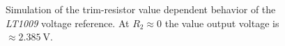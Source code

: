     \newpage
    \begin{figure}[ht]
        \centering
        
        \caption[Simulation of the trim-resistor value dependent behavior of the \textit{LT1009} voltage reference]{Simulation of the trim-resistor value dependent behavior of the \textit{LT1009} voltage reference. At \(R_2 \approx 0\) the value output voltage is \(\approx \qty{2.385}{\volt}\).}%
        \label{fig:LT1009 sim}
    \end{figure}
    \newpage
    \begin{figure}
        \centering
        \begin{subfigure}{.3\textwidth}

\end{subfigure}
\end{figure}
